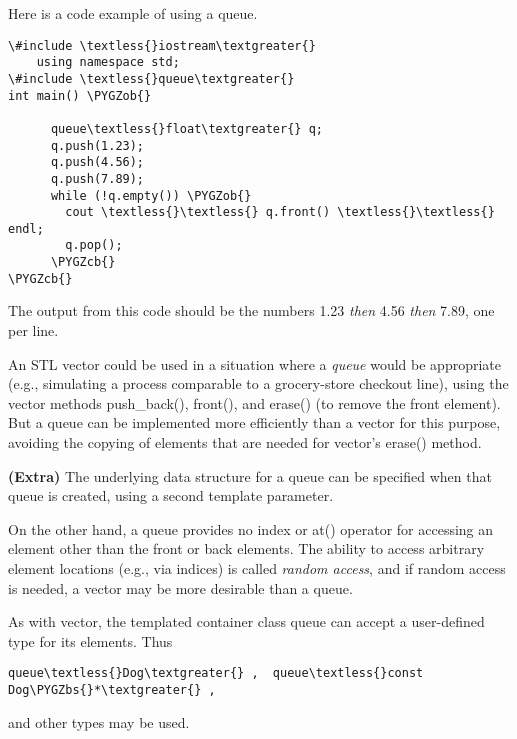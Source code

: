\documentclass[letterpaper,10pt,openany,oneside]{sphinxmanual}
\def\PYGZbs{\char`\\}
\def\PYGZob{\char`\{}
\def\PYGZcb{\char`\}}
\begin{document}
Here is a code example of using a queue.

\begin{Verbatim}[commandchars=\\\{\}]
\#include \textless{}iostream\textgreater{}
    using namespace std;
\#include \textless{}queue\textgreater{}
int main() \PYGZob{}

      queue\textless{}float\textgreater{} q;
      q.push(1.23);
      q.push(4.56);
      q.push(7.89);
      while (!q.empty()) \PYGZob{}
        cout \textless{}\textless{} q.front() \textless{}\textless{} endl;
        q.pop();
      \PYGZcb{}
\PYGZcb{}
\end{Verbatim}

The output from this code should be the numbers 1.23 \emph{then} 4.56
\emph{then} 7.89, one per line.

An STL vector could be used in a situation where a \emph{queue} would
be appropriate (e.g., simulating a process comparable to a grocery-store
checkout line), using the vector methods push\_back(), front(), and
erase() (to remove the front element). But a queue can be implemented
more efficiently than a vector for this purpose, avoiding the copying of
elements that are needed for vector's erase() method.

\textbf{(Extra)} The underlying data structure for a queue can be
specified when that queue is created, using a second template
parameter.

On the other hand, a queue provides no index or at() operator for
accessing an element other than the front or back elements. The ability
to access arbitrary element locations (e.g., via indices) is called
\emph{random access}, and if random access is needed, a vector may be more
desirable than a queue.

As with vector, the templated container class queue can accept a
user-defined type for its elements. Thus

\begin{Verbatim}[commandchars=\\\{\}]
queue\textless{}Dog\textgreater{} ,  queue\textless{}const Dog\PYGZbs{}*\textgreater{} ,
\end{Verbatim}

and other types may be used.



\renewcommand{\indexname}{Index}
\printindex
\end{document}
